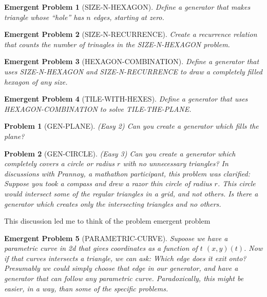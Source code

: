 \documentclass[11pt]{article}
\newtheorem{problem}{Problem}
\newtheorem{eproblem}{Emergent Problem}
\begin{document}
\begin{eproblem}[SIZE-N-HEXAGON]
  Define a generator that makes triangle whose ``hole'' has $n$ edges, starting at zero.
\end{eproblem}
\begin{eproblem}[SIZE-N-RECURRENCE]
  Create a recurrence relation that counts the number of trinagles in the SIZE-N-HEXAGON problem.
\end{eproblem}
\begin{eproblem}[HEXAGON-COMBINATION]
  Define a generator that uses SIZE-N-HEXAGON and SIZE-N-RECURRENCE to draw a completely filled hexagon of any size.
\end{eproblem}
\begin{eproblem}[TILE-WITH-HEXES]
  Define a generator that uses HEXAGON-COMBINATION to solve TILE-THE-PLANE.
\end{eproblem}

\begin{problem}[GEN-PLANE]
(Easy 2) Can you create a generator which fills the plane?  
\end{problem}

\begin{problem}[GEN-CIRCLE]
  (Easy 3) Can you create a generator which completely covers a circle or radius $r$ with no unnecessary triangles?
  In discussions with Prannoy, a mathathon participant, this problem was clarified: Suppose you took a compass and
  drew a razor thin circle of radius $r$. This circle would intersect some of the regular triangles in a grid,
  and not others. Is there a generator which creates only the intersecting triangles and no others.
\end{problem}

This discussion led me to think of the problem emergent problem
\begin{eproblem}[PARAMETRIC-CURVE]
  Supoose we have a parametric curve in 2d that gives coordinates as a function of $t$ $(x,y)(t)$.
  Now if that curves intersects a triangle, we can ask: Which edge does it exit onto? Presumably we could
  simply choose that edge in our generator, and have a generator that can follow any parametric curve.
  Paradoxically, this might be easier, in a way, than some of the specific problems.
\end{eproblem}
\end{document}
